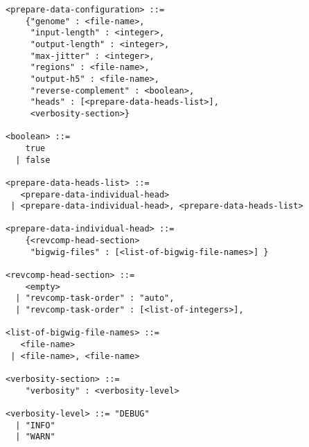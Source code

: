\documentclass{article}
\begin{document}
\begin{lstlisting}
<prepare-data-configuration> ::=
    {"genome" : <file-name>,
     "input-length" : <integer>,
     "output-length" : <integer>,
     "max-jitter" : <integer>,
     "regions" : <file-name>,
     "output-h5" : <file-name>,
     "reverse-complement" : <boolean>,
     "heads" : [<prepare-data-heads-list>],
     <verbosity-section>}

<boolean> ::=
    true
  | false

<prepare-data-heads-list> ::=
   <prepare-data-individual-head>
 | <prepare-data-individual-head>, <prepare-data-heads-list>

<prepare-data-individual-head> ::=
    {<revcomp-head-section>
     "bigwig-files" : [<list-of-bigwig-file-names>] }

<revcomp-head-section> ::=
    <empty>
  | "revcomp-task-order" : "auto",
  | "revcomp-task-order" : [<list-of-integers>],

<list-of-bigwig-file-names> ::=
   <file-name>
 | <file-name>, <file-name>

<verbosity-section> ::=
    "verbosity" : <verbosity-level>

<verbosity-level> ::= "DEBUG"
  | "INFO"
  | "WARN"
\end{lstlisting}
\end{document}
